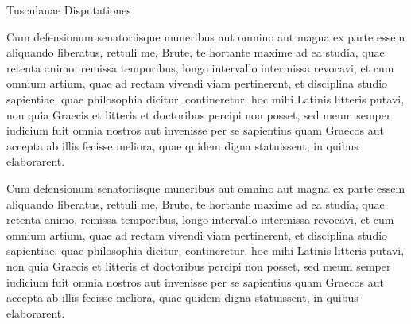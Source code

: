 \documentclass[11pt,b5paper,twoside]{book}
\begin{document}
\beginnumbering
\pstart
\begin{center}
    {\Large {}Tusculanae Disputationes}
\end{center}
\pend
\bigskip

\setcounter{pstart}{1}
\numberpstarttrue

\pstart{}%
    Cum defensionum  senatoriisque muneribus aut omnino aut magna ex parte essem aliquando liberatus, rettuli me, Brute, te hortante maxime ad ea studia, quae retenta animo, remissa temporibus, longo intervallo intermissa revocavi, et cum omnium artium, quae ad rectam vivendi viam pertinerent,  et disciplina studio sapientiae, quae philosophia dicitur, contineretur, hoc mihi Latinis litteris  putavi, non quia  Graecis et litteris et doctoribus percipi non posset, sed meum semper iudicium fuit omnia nostros aut invenisse per se sapientius quam Graecos aut accepta ab illis fecisse meliora, quae quidem digna statuissent, in quibus elaborarent.
\pend

\pstart%
%
Cum defensionum  senatoriisque muneribus aut omnino aut magna ex parte essem aliquando liberatus, rettuli me, Brute, te hortante maxime ad ea studia, quae retenta animo, remissa temporibus, longo intervallo intermissa revocavi, et cum omnium artium, quae ad rectam vivendi viam pertinerent,  et disciplina studio sapientiae, quae philosophia dicitur, contineretur, hoc mihi Latinis litteris  putavi, non quia  Graecis et litteris et doctoribus percipi non posset, sed meum semper iudicium fuit omnia nostros aut invenisse per se sapientius quam Graecos aut accepta ab illis fecisse meliora, quae quidem digna statuissent, in quibus elaborarent.
\pend
\end{document}
